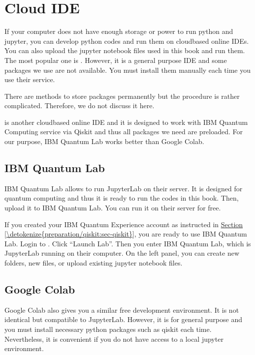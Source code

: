 \documentclass[letterpaper,10pt,english]{jupyterBook}
\begin{document}
\section{Cloud IDE}
\label{\detokenize{preparation/cloud:cloud-ide}}\label{\detokenize{preparation/cloud:sec-cloud}}\label{\detokenize{preparation/cloud::doc}}
\sphinxAtStartPar
If your computer does not have enough storage or power to run python and jupyter, you can develop python codes and run them on cloud\sphinxhyphen{}based online IDEs.  You can also upload the jupyter notebook files used in this book and run them.  The most popular one is .  However, it is a general purpose IDE and some packages we use are not available.  You must install them manually each time you use their service.%
\begin{footnote}[1]\sphinxAtStartFootnote
There are methods to store packages permanently but the procedure is rather complicated.  Therefore, we do not discuss it here.
%
\end{footnote}   is another cloud\sphinxhyphen{}based online IDE and it is designed to work with IBM Quantum Computing service via Qiskit and thus all packages we need are preloaded.  For our purpose, IBM Quantum Lab works better than Google Colab.


\subsection{IBM Quantum Lab}
\label{\detokenize{preparation/cloud:ibm-quantum-lab}}\label{\detokenize{preparation/cloud:sec-ibmqlab}}
\sphinxAtStartPar
IBM Quantum Lab allows to run JupyterLab on their server.  It is designed for quantum computing and thus it is ready to run the codes in this book.  Then, upload it to IBM Quantum Lab.  You can run it on their server for free.

\sphinxAtStartPar
If you created your IBM Quantum Experience account as instructed in \hyperref[\detokenize{preparation/qiskit:sec-qiskit}]{Section \ref{\detokenize{preparation/qiskit:sec-qiskit}}}, you are ready to use IBM Quantum Lab.
Login to .  Click “Launch Lab”.  Then you enter IBM Quantum Lab, which is JupyterLab running on their computer.  On the left panel, you can create new folders, new files, or upload existing jupyter notebook files.


\subsection{Google Colab}
\label{\detokenize{preparation/cloud:google-colab}}\label{\detokenize{preparation/cloud:sec-colab}}
\sphinxAtStartPar
Google Colab also gives you a similar free development environment. It is not identical but compatible to JupyterLab.  However, it is for general purpose and you must install necessary python packages such as qiskit each time.  Nevertheless, it is convenient if you do not have access to a local jupyter environment.
\end{document}

